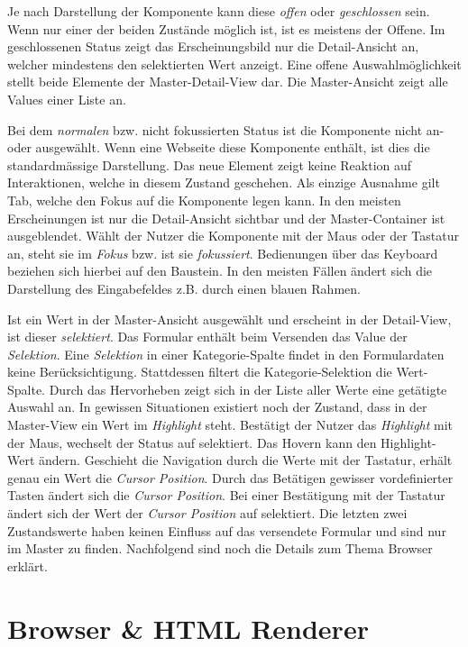 Je nach Darstellung der Komponente kann diese \emph{offen} oder \emph{geschlossen} sein.
Wenn nur einer der beiden Zustände möglich ist, ist es meistens der Offene.
Im geschlossenen Status zeigt das Erscheinungsbild nur die Detail-Ansicht an, welcher mindestens den selektierten Wert anzeigt.
Eine offene Auswahlmöglichkeit stellt beide Elemente der Master-Detail-View dar.
Die Master-Ansicht zeigt alle Values einer Liste an.

Bei dem \emph{normalen} bzw. nicht fokussierten Status ist die Komponente nicht an- oder ausgewählt.
Wenn eine Webseite diese Komponente enthält, ist dies die standardmässige Darstellung.
Das neue Element zeigt keine Reaktion auf Interaktionen, welche in diesem Zustand geschehen. 
Als einzige Ausnahme gilt Tab, welche den Fokus auf die Komponente legen kann. 
In den meisten Erscheinungen ist nur die Detail-Ansicht sichtbar und der Master-Container ist ausgeblendet.
Wählt der Nutzer die Komponente mit der Maus oder der Tastatur an, steht sie im \emph{Fokus} bzw. ist sie \emph{fokussiert}.
Bedienungen über das Keyboard beziehen sich hierbei auf den Baustein.
In den meisten Fällen ändert sich die Darstellung des Eingabefeldes z.B. durch einen blauen Rahmen.

Ist ein Wert in der Master-Ansicht ausgewählt und erscheint in der Detail-View, ist dieser \emph{selektiert}.
Das Formular enthält beim Versenden das Value der \emph{Selektion}.
Eine \emph{Selektion} in einer Kategorie-Spalte findet in den Formulardaten keine Berücksichtigung.
Stattdessen filtert die Kategorie-Selektion die Wert-Spalte.
Durch das Hervorheben zeigt sich in der Liste aller Werte eine getätigte Auswahl an.
In gewissen Situationen existiert noch der Zustand, dass in der Master-View ein Wert im \emph{Highlight} steht. 
Bestätigt der Nutzer das \emph{Highlight} mit der Maus, wechselt der Status auf selektiert.
Das Hovern kann den Highlight-Wert ändern. 
Geschieht die Navigation durch die Werte mit der Tastatur, erhält genau ein Wert die \emph{Cursor Position}. 
Durch das Betätigen gewisser vordefinierter Tasten ändert sich die \emph{Cursor Position}.
Bei einer Bestätigung mit der Tastatur ändert sich der Wert der \emph{Cursor Position} auf selektiert.
Die letzten zwei Zustandswerte haben keinen Einfluss auf das versendete Formular und sind nur im Master zu finden.
Nachfolgend sind noch die Details zum Thema Browser erklärt.


\section{Browser \& HTML Renderer}
\label{sec:browserRenderer}


